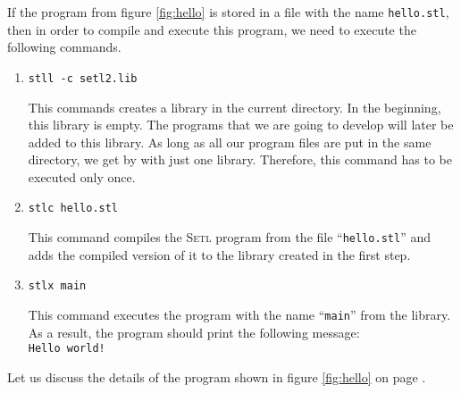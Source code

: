 If the program from figure \ref{fig:hello} is stored in a file with the name
\texttt{hello.stl}, then in order to compile and execute this program, we need
to execute the following commands.
\begin{enumerate}
\item \texttt{stll -c setl2.lib}

      This commands creates  a library in the current directory.  In the beginning, this
      library is empty. 
      The programs  that we are going to develop will later be added to this library.
      As long as all our program files are put in the same directory, we get by with just one
      library.  Therefore, this command has to be executed only once. 
\item \texttt{stlc hello.stl}

      This command compiles the \textsc{Setl} program from the file 
      ``\texttt{hello.stl}'' and adds the compiled version of it to the library created in
      the first step.
\item \texttt{stlx main}

      This command executes the program with the name ``\texttt{main}'' from the library.
      As a result, the program should print the following message:
      \\[0.2cm]
      \hspace*{1.3cm}
      \hspace*{1.3cm} \texttt{Hello world!}
\end{enumerate}
Let us discuss the details of the program shown in figure
\ref{fig:hello} on page \pageref{fig:hello}.

